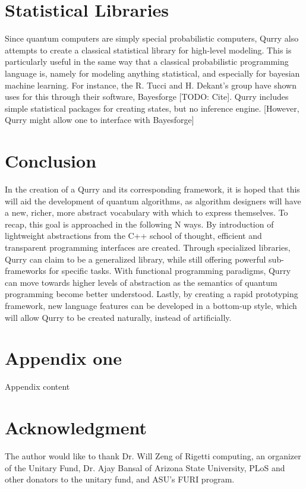 \documentclass[a4paper,twocolumn,11pt,accepted=2017-05-09]{quantumarticle}
\begin{document}
\section{Statistical Libraries}

Since quantum computers are simply special probabilistic computers, Qurry also attempts to create a classical statistical library for high-level modeling. 
This is particularly useful in the same way that a classical probabilistic programming language is, namely for modeling anything statistical, and especially for bayesian machine learning.
For instance, the R. Tucci and H. Dekant's group have shown uses for this through their software, Bayesforge [TODO: Cite].
Qurry includes simple statistical packages for creating states, but no inference engine.
[However, Qurry might allow one to interface with Bayesforge]

\section{Conclusion}

In the creation of a Qurry and its corresponding framework, it is hoped that this will aid the development of quantum algorithms, as algorithm designers will have a new, richer, more abstract vocabulary with which to express themselves.
To recap, this goal is approached in the following N ways.
By introduction of lightweight abstractions from the C++ school of thought, efficient and transparent programming interfaces are created.
Through specialized libraries, Qurry can claim to be a generalized library, while still offering powerful sub-frameworks for specific tasks.
With functional programming paradigms, Qurry can move towards higher levels of abstraction as the semantics of quantum programming become better understood.
Lastly, by creating a rapid prototyping framework, new language features can be developed in a bottom-up style, which will allow Qurry to be created naturally, instead of artificially.

 \section{Appendix one}
Appendix content

\section*{Acknowledgment}

The author would like to thank Dr. Will Zeng of Rigetti computing, an organizer of the Unitary Fund, Dr. Ajay Bansal of Arizona State University, PLoS and other donators to the unitary fund, and ASU's FURI program.
\end{document}
